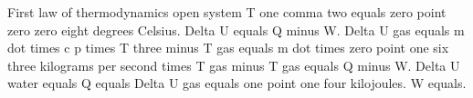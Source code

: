 First law of thermodynamics open system T one comma two equals zero point zero zero eight degrees Celsius. Delta U equals Q minus W. Delta U gas equals m dot times c p times T three minus T gas equals m dot times zero point one six three kilograms per second times T gas minus T gas equals Q minus W. Delta U water equals Q equals Delta U gas equals one point one four kilojoules. W equals.
